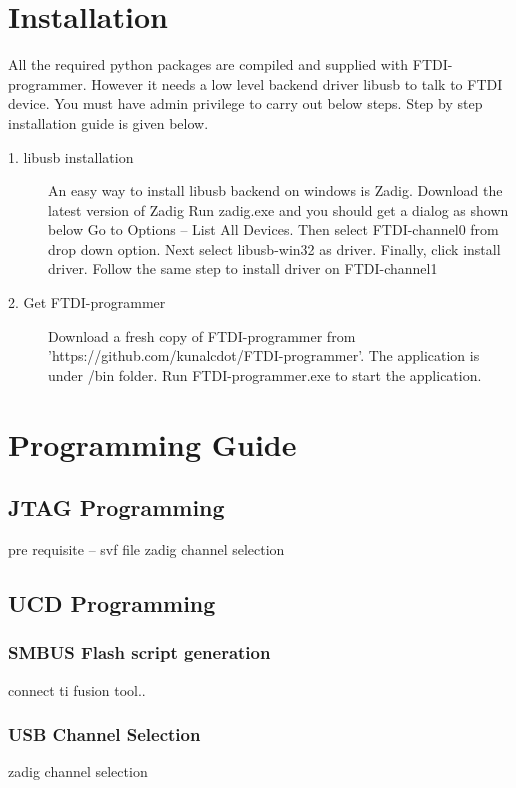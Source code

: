 \section{Installation}\label{sec:install}
	All the required python packages are compiled and supplied with FTDI-programmer. However it needs a low level backend driver
	libusb to talk to FTDI device. You must have admin privilege to carry out below steps.
	Step by step installation guide is given below.
	\begin{description}
		\item [1. libusb installation]
		An easy way to install libusb backend on windows is Zadig. Download the latest version of Zadig %
		Run zadig.exe and you should get a dialog as shown below
		Go to Options -- List All Devices. Then select FTDI-channel0 from drop down option. Next select libusb-win32 as driver.
		Finally, click install driver.
		Follow the same step to install driver on FTDI-channel1
		
		\item [2. Get FTDI-programmer]
		Download a fresh copy of FTDI-programmer from 'https://github.com/kunalcdot/FTDI-programmer'. The application is 
		under /bin folder. Run FTDI-programmer.exe to start the application.
		
	\end{description}
	



\section{Programming Guide}\label{sec:prog_guide}
	\subsection{JTAG Programming}
	pre requisite -- svf file
	zadig channel selection
	
	
	\subsection{UCD Programming}
		\subsubsection{SMBUS Flash script generation}
			connect ti fusion tool.. 
			
		\subsubsection{USB Channel Selection}
			zadig channel selection
		
